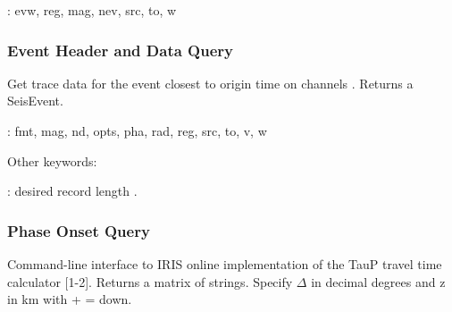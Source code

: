 \documentclass[letterpaper,11pt,english]{sphinxmanual}
\begin{document}
\begin{DUlineblock}{0em}
\item[] {\hyperref[\detokenize{src/Appendices/keywords:dkw}]{}}: evw, reg, mag, nev, src, to, w
\end{DUlineblock}


\subsubsection{Event Header and Data Query}
\label{\detokenize{src/Submodules/quake:event-header-and-data-query}}

\begin{fulllineitems}
\label{\detokenize{src/Submodules/quake:FDSNevt}}
\end{fulllineitems}


Get trace data for the event closest to origin time  on channels .
Returns a SeisEvent.

\begin{DUlineblock}{0em}
\item[] {\hyperref[\detokenize{src/Appendices/keywords:dkw}]{}}: fmt, mag, nd, opts, pha, rad, reg, src, to, v, w
\item[] Other keywords:
\item[] : desired record length .
\end{DUlineblock}


\subsubsection{Phase Onset Query}
\label{\detokenize{src/Submodules/quake:phase-onset-query}}

\begin{fulllineitems}
\label{\detokenize{src/Submodules/quake:get_pha}}
\end{fulllineitems}


Command-line interface to IRIS online implementation of the TauP travel time
calculator {[}1-2{]}. Returns a matrix of strings. Specify \(\Delta\) in decimal degrees
and z in km with + = down.
\end{document}
